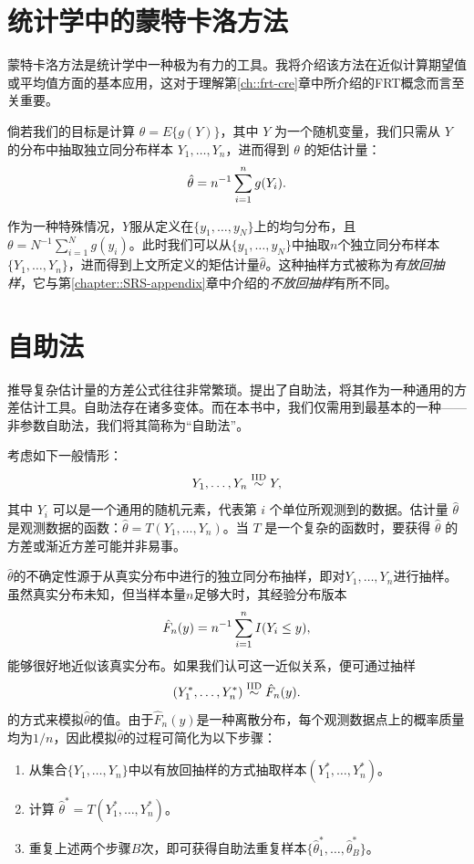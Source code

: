\section{统计学中的蒙特卡洛方法}\label{sec::monte-carlo-method}


蒙特卡洛方法是统计学中一种极为有力的工具。我将介绍该方法在近似计算期望值或平均值方面的基本应用，这对于理解第\ref{ch::frt-cre}章中所介绍的FRT概念而言至关重要。 


倘若我们的目标是计算 $\theta = E\{  g(Y)\}$，其中 $Y$ 为一个随机变量，我们只需从 $Y$ 的分布中抽取独立同分布样本 $Y_1,\ldots, Y_n$，进而得到 $\theta$ 的矩估计量：
$$
\hat\theta = n^{-1} \sum_{i=1}^n g(Y_i).
$$

作为一种特殊情况，$Y$服从定义在$\{ y_1, \ldots, y_N \}$上的均匀分布，且$\theta = N^{-1} \sum_{i=1}^N g(y_i)$。此时我们可以从$\{ y_1, \ldots, y_N \}$中抽取$n$个独立同分布样本$\{ Y_1, \ldots, Y_n \}$，进而得到上文所定义的矩估计量$\hat\theta $。这种抽样方式被称为{\it 有放回抽样}，它与第\ref{chapter::SRS-appendix}章中介绍的{\it 不放回抽样}有所不同。 



\section{自助法}
\label{sec::bootstrap}


 
推导复杂估计量的方差公式往往非常繁琐。\citet{Efron_1979}提出了自助法，将其作为一种通用的方差估计工具。自助法存在诸多变体\citep{davison1997bootstrap}。而在本书中，我们仅需用到最基本的一种——非参数自助法，我们将其简称为“自助法”。 


考虑如下一般情形：$$
Y_1,\ldots, Y_n \stackrel{\textup{IID}}{\sim} Y,
$$ 其中 $Y_i$ 可以是一个通用的随机元素，代表第 $i$ 个单位所观测到的数据。估计量 $\hat\theta$ 是观测数据的函数：$\hat\theta = T(Y_1, \ldots, Y_n)$。当 $T$ 是一个复杂的函数时，要获得 $\hat\theta$ 的方差或渐近方差可能并非易事。 

$\hat\theta$的不确定性源于从真实分布中进行的独立同分布抽样，即对$Y_1,\ldots, Y_n$进行抽样。虽然真实分布未知，但当样本量$n$足够大时，其经验分布版本$$
\hat{F}_n(y) = n^{-1} \sum_{i=1}^n I(Y_i \leq y),
$$能够很好地近似该真实分布。如果我们认可这一近似关系，便可通过抽样$$
(Y_1^*,\ldots, Y_n^* ) \stackrel{\textup{IID}}{\sim} \hat{F}_n(y).
$$的方式来模拟$\hat\theta$的值。由于$\hat{F}_n(y) $是一种离散分布，每个观测数据点上的概率质量均为$1/n$，因此模拟$\hat\theta$的过程可简化为以下步骤： 
\begin{enumerate}
\item
从集合$\{Y_1,\ldots, Y_n \}$中以有放回抽样的方式抽取样本$(Y_1^*,\ldots, Y_n^* ) $。
\item
计算 $\hat{\theta}^* = T(Y_1^*, \ldots, Y_n^*)$。
\item
重复上述两个步骤$B$次，即可获得自助法重复样本$\{  \hat{\theta}^*_1, \ldots, \hat{\theta}^*_B \}$。
\end{enumerate}




